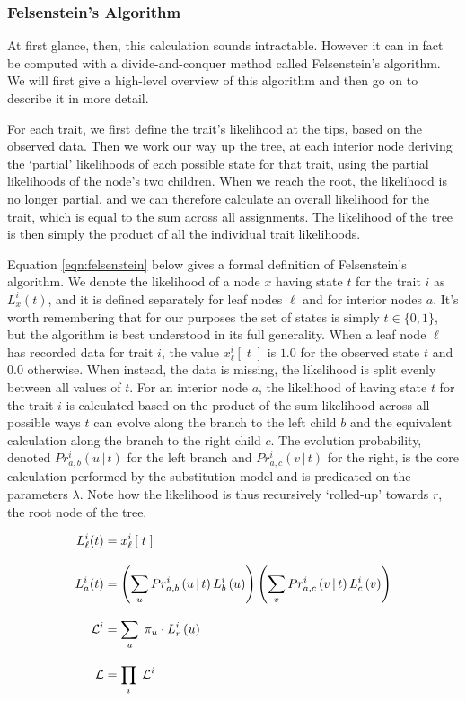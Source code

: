 \documentclass[10pt,journal,compsoc]{IEEEtran}
\begin{document}
\subsubsection{Felsenstein's Algorithm}

At first glance, then, this calculation sounds intractable. However it can in fact be computed with a divide-and-conquer method called Felsenstein's algorithm. We will first give a high-level overview of this algorithm and then go on to describe it in more detail.

For each trait, we first define the trait's likelihood at the tips, based on the observed data. Then we work our way up the tree, at each interior node deriving the `partial' likelihoods of each possible state for that trait, using the partial likelihoods of the node's two children. When we reach the root, the likelihood is no longer partial, and we can therefore calculate an overall likelihood for the trait, which is equal to the sum across all assignments. The likelihood of the tree is then simply the product of all the individual trait likelihoods.\cite{felsenstein2004inferring}

Equation \eqref{eqn:felsenstein} below gives a formal definition of Felsenstein's algorithm. We denote the likelihood of a node $x$ having state $t$ for the trait $i$ as $L_x^{i}(t)$, and it is defined separately for leaf nodes $\ell$ and for interior nodes $a$. It's worth remembering that for our purposes the set of states is simply $t \in \{0, 1\}$, but the algorithm is best understood in its full generality. When a leaf node $\ell$ has recorded data for trait $i$, the value $x_\ell^{i}\left[\;t\;\right]$ is $1.0$ for the observed state $t$ and $0.0$ otherwise. When instead, the data is missing, the likelihood is split evenly between all values of $t$. For an interior node $a$, the likelihood of having state $t$ for the trait $i$ is calculated based on the product of the sum likelihood across all possible ways $t$ can evolve along the branch to the left child $b$ and the equivalent calculation along the branch to the right child $c$. The evolution probability, denoted $Pr^i_{a,b}\left(u\,\vert\,t\right)$ for the left branch and $Pr^i_{a,c}\left(v\,\vert\,t\right)$ for the right, is the core calculation performed by the substitution model and is predicated on the parameters $\lambda$. Note how the likelihood is thus recursively `rolled-up' towards $r$, the root node of the tree.

\begin{equation}\label{eqn:felsenstein}
    \setlength{\jot}{12px}
    \begin{split}
        L_\ell^{i}(t) &= x_\ell^{i}\left[\;t\;\right] \\
        L_a^{i}(t) &= \left(\sum_uPr^i_{a,b}\left(u\,\vert\,t\right)L_b^{i}\left(u\right)\right)\left(\sum_vPr^i_{a,c}\left(v\,\vert\,t\right)L_c^{i}\left(v\right)\right) \\
        \mathcal{L}^{i} &= \sum_u \;\pi_u \cdot L_r^{i}\left(u\right) \\
        \mathcal{L} &= \prod_i \;\mathcal{L}^i
    \end{split}
\end{equation}
\end{document}
